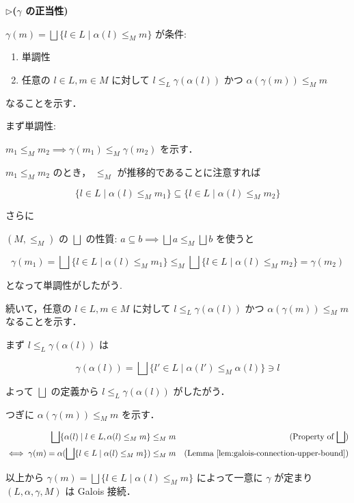 \documentclass[uplatex]{jsarticle}
\newenvironment{proofpart}[1]
  {\par\vspace{1em}\noindent\hspace{10pt}$\triangleright$\hspace{5pt}\textbf{#1}\\[0.3em]
   \hspace{10pt}\begin{tcolorbox}[enhanced,
     left=20pt, right=0pt, top=3pt, bottom=3pt,
     colback=white,
     colframe=white,
     leftrule=0.3pt,
     rightrule=0pt,
     toprule=0pt,
     bottomrule=0pt,
     sharp corners,
     boxsep=0pt,
     before skip=0pt,
     after skip=1em
   ]}
  {\end{tcolorbox}}
\begin{document}
\begin{proofpart}{($\gamma$ の正当性)}

  $\gamma(m) = \bigsqcup \{ l \in L \mid \alpha(l) \leq_M m \}$ が条件:

  \begin{enumerate}
    \item 単調性
    \item 任意の $l \in L, m \in M$ に対して $l \leq_L \gamma(\alpha(l))$ かつ $\alpha(\gamma(m)) \leq_M m$
  \end{enumerate}

  なることを示す．

  まず単調性:

  $m_1 \leq_M m_2 \implies \gamma(m_1) \leq_M \gamma(m_2)$ を示す．

  $m_1 \leq_M m_2$ のとき， $\leq_M$ が推移的であることに注意すれば

  $$
    \{ l \in L \mid \alpha(l) \leq_M m_1 \} \subseteq \{ l \in L \mid \alpha(l) \leq_M m_2 \}
  $$

  さらに

  $(M, \leq_M)$ の $\bigsqcup$ の性質: $a \subseteq b \implies \bigsqcup a \leq_M \bigsqcup b$ を使うと

  $$
    \gamma(m_1) = \bigsqcup \{ l \in L \mid \alpha(l) \leq_M m_1 \} \leq_M
    \bigsqcup \{ l \in L \mid \alpha(l) \leq_M m_2 \} = \gamma(m_2)
  $$


  となって単調性がしたがう.

  続いて，任意の $l \in L, m \in M$ に対して $l \leq_L \gamma(\alpha(l))$ かつ $\alpha(\gamma(m)) \leq_M m$ なることを示す．


  まず $l \leq_L \gamma(\alpha(l))$ は

  $$
    \gamma(\alpha(l)) = \bigsqcup \{ l' \in L \mid \alpha(l') \leq_M \alpha(l) \} \ni l
  $$

  よって $\bigsqcup$ の定義から $l \leq_L \gamma(\alpha(l))$ がしたがう．


  つぎに $\alpha(\gamma(m)) \leq_M m$ を示す．


  \begin{align*}
    \bigsqcup \{ \alpha(l) \mid l \in L, \alpha(l) \leq_M m \}               & \leq_M m
                                                                             & \text{(Property of $\bigsqcup$)}                       \\
    \iff \gamma(m) = \alpha(\bigsqcup \{ l \in L \mid \alpha(l) \leq_M m \}) & \leq_M m
                                                                             & \text{(Lemma \ref{lem:galois-connection-upper-bound})} \\
  \end{align*}


  以上から $\gamma(m) = \bigsqcup \{ l \in L \mid \alpha(l) \leq_M m \}$ によって一意に $\gamma$ が定まり
  $(L, \alpha, \gamma, M)$ は Galois 接続．

\end{proofpart}
\end{document}
